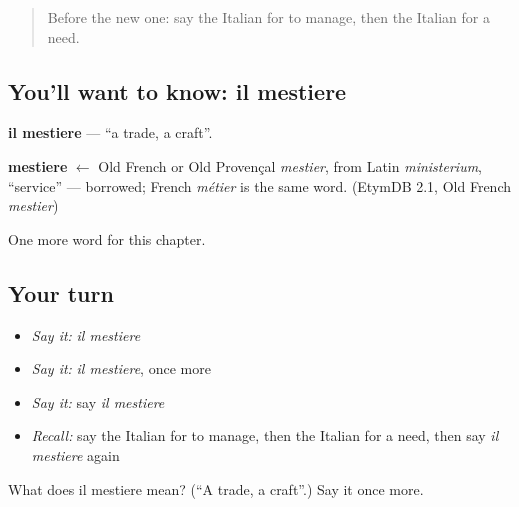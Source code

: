 \label{lesson:IT-C85-mestiere}



\begin{quote}
Before the new one: say the Italian for to manage, then the Italian for a need.
\end{quote}

\subsection*{You'll want to know: il mestiere}
\textbf{il mestiere} — \textquotedblleft{}a trade, a craft\textquotedblright{}.

\begin{cousinweb}
\textbf{mestiere} $\leftarrow$ Old French or Old Provençal \emph{mestier}, from Latin \emph{ministerium}, \textquotedblleft{}service\textquotedblright{} — borrowed; French \emph{métier} is the same word. (EtymDB 2.1, Old French \emph{mestier})
\end{cousinweb}

\begin{grammarlens}[title={What you've built}]
One more word for this chapter.
\end{grammarlens}

\subsection*{Your turn}
\begin{itemize}
\raggedright
  \item \emph{Say it:} \emph{il mestiere}
  \item \emph{Say it:} \emph{il mestiere}, once more
  \item \emph{Say it:} say \emph{il mestiere}
  \item \emph{Recall:} say the Italian for to manage, then the Italian for a need, then say \emph{il mestiere} again
\end{itemize}

\begin{tcolorbox}[breakable,colback=teal!4,colframe=teal!35!black,title={Before you move on}]
What does il mestiere mean? (\textquotedblleft{}A trade, a craft\textquotedblright{}.) Say it once more.
\end{tcolorbox}
